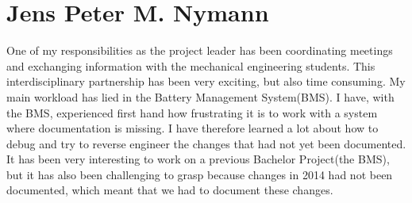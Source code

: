 \section{Jens Peter M. Nymann}
One of my responsibilities as the project leader has been coordinating meetings and exchanging information with the mechanical engineering students. This interdisciplinary partnership has been very exciting, but also time consuming. My main workload has lied in the Battery Management System(BMS). I have, with the BMS, experienced first hand how frustrating it is to work with a system where documentation is missing. I have therefore learned a lot about how to debug and try to reverse engineer the changes that had not yet been documented. It has been very interesting to work on a previous Bachelor Project(the BMS), but it has also been challenging to grasp because changes in 2014 had not been documented, which meant that we had to document these changes.
